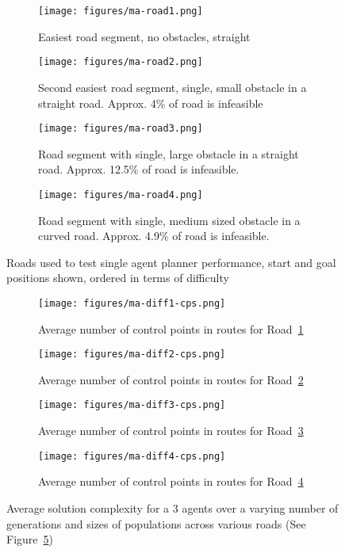 \begin{figure}
  \centering
  \begin{subfigure}[b]{0.44\textwidth}
    \centering
    \texttt{[image: figures/ma-road1.png]}
    \caption{\label{subfig:ma-road1}Easiest road segment, no obstacles, straight}
  \end{subfigure}
  \begin{subfigure}[b]{0.44\textwidth}
    \centering
    \texttt{[image: figures/ma-road2.png]}
    \caption{\label{subfig:ma-road2}Second easiest road segment, single, small obstacle in a straight road. Approx. 4\% of road is infeasible}
  \end{subfigure}
  \begin{subfigure}[b]{0.44\textwidth}
    \centering
    \texttt{[image: figures/ma-road3.png]}
    \caption{\label{subfig:ma-road3}Road segment with single, large obstacle in a straight road. Approx. 12.5\% of road is infeasible.}
  \end{subfigure}
  \begin{subfigure}[b]{0.44\textwidth}
    \centering
    \texttt{[image: figures/ma-road4.png]}
    \caption{\label{subfig:ma-road4}Road segment with single, medium sized obstacle in a curved road. Approx. 4.9\% of road is infeasible.}
  \end{subfigure}
  \caption{\label{fig:multi-agent-roads} Roads used to test single agent planner performance, start and goal positions shown, ordered in terms of difficulty}
\end{figure}

\begin{figure}
  \centering
  \begin{subfigure}[b]{0.44\textwidth}
    \centering
    \texttt{[image: figures/ma-diff1-cps.png]}
    \caption{\label{subfig:ma-diff1-cps}Average number of control points in routes for Road~\ref{subfig:ma-road1}}
  \end{subfigure}
  \begin{subfigure}[b]{0.44\textwidth}
    \centering
    \texttt{[image: figures/ma-diff2-cps.png]}
    \caption{\label{subfig:ma-diff2-cps}Average number of control points in routes for Road~\ref{subfig:ma-road2}}
  \end{subfigure}
  \begin{subfigure}[b]{0.44\textwidth}
    \centering
    \texttt{[image: figures/ma-diff3-cps.png]}
    \caption{\label{subfig:ma-diff3-cps}Average number of control points in routes for Road~\ref{subfig:ma-road3}}
  \end{subfigure}
  \begin{subfigure}[b]{0.44\textwidth}
    \centering
    \texttt{[image: figures/ma-diff4-cps.png]}
    \caption{\label{subfig:ma-diff4-cps}Average number of control points in routes for Road~\ref{subfig:ma-road4}}
  \end{subfigure}
  \caption{\label{fig:multi-agent-cps} Average solution complexity for a 3 agents over a varying number of generations and sizes of populations across various roads (See Figure~\ref{fig:multi-agent-roads}) }
\end{figure}

